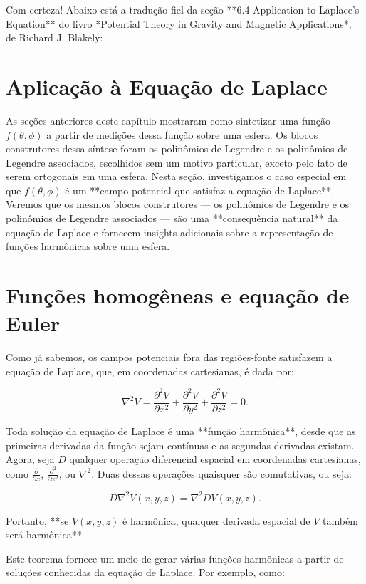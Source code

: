 Com certeza! Abaixo está a tradução fiel da seção **6.4 Application to Laplace’s Equation** do livro *Potential Theory in Gravity and Magnetic Applications*, de Richard J. Blakely:

\section{Aplicação à Equação de Laplace}



As seções anteriores deste capítulo mostraram como sintetizar uma função $f(\theta, \phi)$ a partir de medições dessa função sobre uma esfera. Os blocos construtores dessa síntese foram os polinômios de Legendre e os polinômios de Legendre associados, escolhidos sem um motivo particular, exceto pelo fato de serem ortogonais em uma esfera. Nesta seção, investigamos o caso especial em que $f(\theta, \phi)$ é um **campo potencial que satisfaz a equação de Laplace**. Veremos que os mesmos blocos construtores — os polinômios de Legendre e os polinômios de Legendre associados — são uma **consequência natural** da equação de Laplace e fornecem insights adicionais sobre a representação de funções harmônicas sobre uma esfera.


\section{Funções homogêneas e equação de Euler}


Como já sabemos, os campos potenciais fora das regiões-fonte satisfazem a equação de Laplace, que, em coordenadas cartesianas, é dada por:

$$
\nabla^2 V = \frac{\partial^2 V}{\partial x^2} + \frac{\partial^2 V}{\partial y^2} + \frac{\partial^2 V}{\partial z^2} = 0.
$$

Toda solução da equação de Laplace é uma **função harmônica**, desde que as primeiras derivadas da função sejam contínuas e as segundas derivadas existam. Agora, seja $D$ qualquer operação diferencial espacial em coordenadas cartesianas, como $\frac{\partial}{\partial x}$, $\frac{\partial^2}{\partial x^2}$, ou $\nabla^2$. Duas dessas operações quaisquer são comutativas, ou seja:

$$
D\nabla^2 V(x, y, z) = \nabla^2 D V(x, y, z).
$$

Portanto, **se $V(x, y, z)$ é harmônica, qualquer derivada espacial de $V$ também será harmônica**.

Este teorema fornece um meio de gerar várias funções harmônicas a partir de soluções conhecidas da equação de Laplace. Por exemplo, como:

